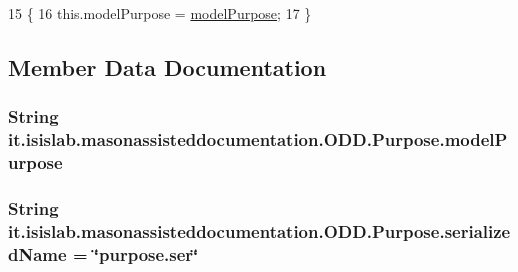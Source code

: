 \begin{DoxyCode}
15                                                     \{
16         this.modelPurpose = \hyperlink{classit_1_1isislab_1_1masonassisteddocumentation_1_1_o_d_d_1_1_purpose_ad09e90f4c22f6070398aa528c1fc3f53}{modelPurpose};
17     \}
\end{DoxyCode}


\subsection{Member Data Documentation}
\hypertarget{classit_1_1isislab_1_1masonassisteddocumentation_1_1_o_d_d_1_1_purpose_ad09e90f4c22f6070398aa528c1fc3f53}{
\subsubsection[{model\-Purpose}]{\setlength{\rightskip}{0pt plus 5cm}String it.\-isislab.\-masonassisteddocumentation.\-O\-D\-D.\-Purpose.\-model\-Purpose\hspace{0.3cm}{\ttfamily [private]}}}\label{classit_1_1isislab_1_1masonassisteddocumentation_1_1_o_d_d_1_1_purpose_ad09e90f4c22f6070398aa528c1fc3f53}
\hypertarget{classit_1_1isislab_1_1masonassisteddocumentation_1_1_o_d_d_1_1_purpose_ab266424bfc9867b998d2beec32c48a87}{
\subsubsection[{serialized\-Name}]{\setlength{\rightskip}{0pt plus 5cm}String it.\-isislab.\-masonassisteddocumentation.\-O\-D\-D.\-Purpose.\-serialized\-Name = \char`\"{}purpose.\-ser\char`\"{}\hspace{0.3cm}{\ttfamily [static]}}}\label{classit_1_1isislab_1_1masonassisteddocumentation_1_1_o_d_d_1_1_purpose_ab266424bfc9867b998d2beec32c48a87}
